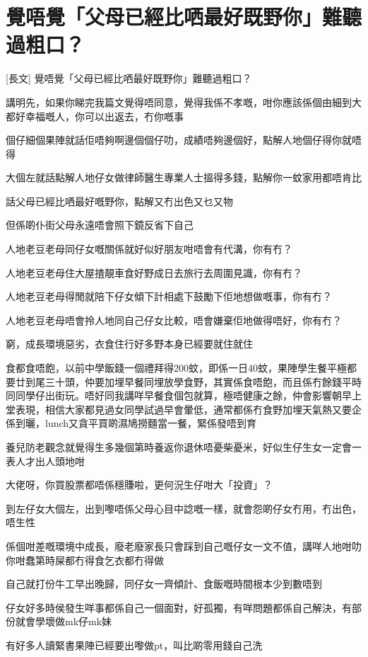 \chapter{覺唔覺「父母已經比哂最好既野你」難聽過粗口？}

[長文] 覺唔覺「父母已經比哂最好既野你」難聽過粗口？

講明先，如果你睇完我篇文覺得唔同意，覺得我係不孝嘅，咁你應該係個由細到大都好幸福嘅人，你可以出返去，冇你嘅事

個仔細個果陣就話佢唔夠啊邊個個仔叻，成績唔夠邊個好，點解人地個仔得你就唔得

大個左就話點解人地仔女做律師醫生專業人士搵得多錢，點解你一蚊家用都唔肯比

話父母已經比哂最好嘅野你，點解又冇出色又乜又物

但係啲仆街父母永遠唔會照下鏡反省下自己

人地老豆老母同仔女嘅關係就好似好朋友咁唔會有代溝，你有冇？

人地老豆老母住大屋揸靚車食好野成日去旅行去周圍見識，你有冇？

人地老豆老母得閒就陪下仔女傾下計相處下鼓勵下佢地想做嘅事，你有冇？

人地老豆老母唔會拎人地同自己仔女比較，唔會嫌棄佢地做得唔好，你有冇？

窮，成長環境惡劣，衣食住行好多野本身已經要就住就住

食都食唔飽，以前中學飯錢一個禮拜得200蚊，即係一日40蚊，果陣學生餐平極都要廿到尾三十頭，仲要加埋早餐同埋放學食野，其實係食唔飽，而且係冇餘錢平時同同學仔出街玩。唔好同我講咩早餐食個包就算，極唔健康之餘，仲會影響朝早上堂表現，相信大家都見過女同學試過早會暈低，通常都係冇食野加埋天氣熱又要企係到曬，lunch又貪平買啲濕鳩撈麵當一餐，緊係發唔到育

養兒防老觀念就覺得生多幾個第時養返你退休唔憂柴憂米，好似生仔生女一定會一表人才出人頭地咁

大佬呀，你買股票都唔係穩賺啦，更何況生仔咁大「投資」？

到左仔女大個左，出到嚟唔係父母心目中諗嘅一樣，就會怨啲仔女冇用，冇出色，唔生性

係個咁差嘅環境中成長，廢老廢家長只會踩到自己嘅仔女一文不值，講咩人地咁叻你咁蠢第時屎都冇得食乞衣都冇得做

自己就打份牛工早出晚歸，同仔女一齊傾計、食飯嘅時間根本少到數唔到

仔女好多時侯發生咩事都係自己一個面對，好孤獨，有咩問題都係自己解決，有部份就會學壞做mk仔mk妹

有好多人讀緊書果陣已經要出嚟做pt，叫比啲零用錢自己洗

